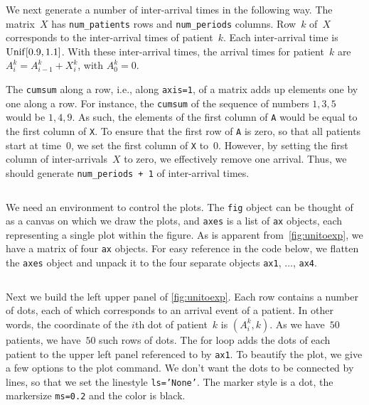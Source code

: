 \documentclass[queueing-book.tex]{subfiles}
\begin{document}
We next generate a number of inter-arrival times in the following way.
The matrix~$X$ has \texttt{num_patients} rows and \texttt{num_periods} columns.
Row~$k$ of~$X$ corresponds to the inter-arrival times of patient~$k$.
Each inter-arrival time is $\mathrm{Unif}[0.9, 1.1]$.
With these inter-arrival times, the arrival times for patient~$k$ are $A_{i}^{k} = A_{i-1}^{k} + X_{i}^{k}$, with $A_0^{k}=0$.

The \texttt{cumsum} along a row, i.e., along \texttt{axis=1}, of a matrix adds up elements one by one along a row.
For instance, the \texttt{cumsum} of the sequence of numbers $1, 3, 5$ would be $1, 4, 9$.
As such, the elements of the first column of \texttt{A} would be equal to the first column of \texttt{X}.
To ensure that the first row of \texttt{A} is zero, so that all patients start at time~$0$, we set the first column of \texttt{X} to~$0$.
However, by setting the first column of inter-arrivals~$X$ to zero, we effectively remove one arrival.
Thus, we should generate \texttt{num_periods + 1} of inter-arrival times.

\inputminted[firstline=35, lastline=37]{python}{../code/IBD_simulations.py} %


We need an environment to control the plots.
The \texttt{fig} object can be thought of as a canvas on which we draw the plots, and \texttt{axes} is a list of \texttt{ax} objects, each representing a single plot within the figure.
As is apparent from~\cref{fig:unitoexp}, we have a matrix of four \texttt{ax} objects.
For easy reference in the code below, we flatten
the \texttt{axes} object and unpack it to the four separate objects \texttt{ax1}, $\ldots$, \texttt{ax4}.
\inputminted[firstline=42, lastline=43]{python}{../code/IBD_simulations.py} %

Next we build the left upper panel of \cref{fig:unitoexp}.
Each row contains a number of dots, each of which corresponds to an arrival event of a patient.
In other words, the coordinate of the $i$th dot of patient~$k$ is $(A_{i}^k, k)$.
As we have~$50$ patients, we have~$50$ such rows of dots.
The for loop adds the dots of each patient to the upper left panel referenced to by \texttt{ax1}.
To beautify the plot, we give a few options to the plot command.
We don't want the dots to be connected by lines, so that we set the linestyle \texttt{ls='None'}.
The marker style is a dot, the markersize \texttt{ms=0.2} and the color is black.
\inputminted[firstline=47, lastline=51]{python}{../code/IBD_simulations.py} %
\end{document}
